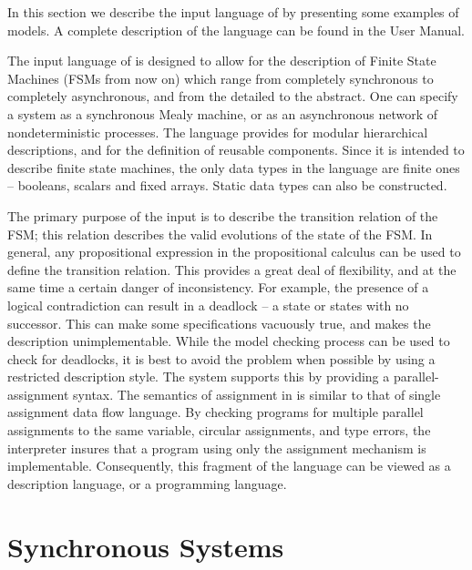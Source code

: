 In this section we describe the input language of \nusmv by
presenting some examples of \nusmv models. A complete description
of the \nusmv language can be found in the \NuSMV User Manual.

The input language of \nusmv is designed to allow for the
description of Finite State Machines (FSMs from now on) which range from
completely synchronous to completely asynchronous, and from the detailed
to the abstract.
One can specify a system as a synchronous Mealy machine, or as
an asynchronous network of nondeterministic processes. The language
provides for modular hierarchical descriptions, and for the definition
of reusable components. Since it is intended to describe finite state
machines, the only data types in the language are finite ones --
booleans, scalars and fixed arrays. Static data types can also be
constructed.

The primary purpose of the \nusmv input is to describe the
transition relation of the FSM; this relation describes the valid
evolutions of the state of the FSM.
In general, any propositional expression in the propositional calculus
can be used to define the transition relation. This
provides a great deal of flexibility, and at the same time a certain
danger of inconsistency. For example, the presence of a logical
contradiction can result in a deadlock -- a state or states with no
successor. This can make some specifications vacuously true, and makes
the description unimplementable.  While the model checking process can
be used to check for deadlocks, it is best to avoid the problem when
possible by using a restricted description style. The \nusmv system
supports this by providing a parallel-assignment syntax. The semantics
of assignment in \nusmv is similar to that of single assignment data
flow language. By checking programs for multiple parallel assignments to
the same variable, circular assignments, and type errors, the
interpreter insures that a program using only the assignment mechanism
is implementable. Consequently, this fragment of the language can be
viewed as a description language, or a programming language.

\section{Synchronous Systems}
\label{Synchronous Systems}

